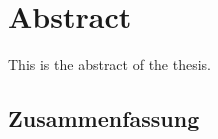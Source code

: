 \section*{Abstract}
This is the abstract of the thesis.

\Blindtext


\cleardoublepage
\begin{otherlanguage}{ngerman}
\section*{Zusammenfassung}
\end{otherlanguage}
